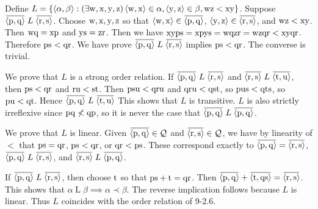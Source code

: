 \begin{solution}
Define $L=\setb{\aprn{\alpha,\beta}}{(\exists \mrm w,\mrm x,\mrm y,\mrm z)\thinspace
\aprn{\mrm w,\mrm x}\in\alpha, \aprn{\mrm y,\mrm z}\in\beta, \mrm{wz}<\mrm{xy}}$.
Suppose $\overbar{\aprn{\mrm p,\mrm q}}\mathrel L \overbar{\aprn{\mrm r,\mrm s}}$.
Choose $\mathrm{w},\mathrm{x},\mathrm{y},\mathrm{z}$ so that $\aprn{\mrm w,\mrm x}\in\overbar{\aprn{\mrm p,\mrm q}}$,
$\aprn{\mrm y,\mrm z}\in\overbar{\aprn{\mrm r,\mrm s}}$, and $\mathrm{wz}<\mathrm{xy}$.
Then $\mathrm{w}\mathrm{q}=\mathrm{x}\mathrm{p}$ and $\mathrm{y}\mathrm{s}=\mathrm{z}\mathrm{r}$.
Then we have $\mathrm{xyps}=\mathrm{xpys}=\mathrm{wqzr}=\mathrm{wzqr}<\mathrm{xyqr}$. Therefore $\mathrm{ps} < \mathrm{qr}$.
We have prove $\overbar{\aprn{\mrm p,\mrm q}}\mathrel L \overbar{\aprn{\mrm r,\mrm s}}$ implies $\mathrm{ps} < \mathrm{qr}$.
The converse is trivial.

We prove that $L$ is a strong order relation.
If $\overbar{\aprn{\mrm p,\mrm q}}\mathrel L \overbar{\aprn{\mrm r,\mrm s}}$ and
$\overbar{\aprn{\mrm r,\mrm s}} \mathrel L \overbar{\aprn{\mrm t,\mrm u}}$,
then $\mathrm{ps} < \mathrm{qr}$ and $\mathrm{ru} < \mathrm{st}$.
Then $\mathrm{psu} < \mathrm{qru}$ and $\mathrm{qru} < \mathrm{qst}$, so $\mathrm{pus} < \mathrm{qts}$, so $\mathrm{pu} < \mathrm{qt}$.
Hence $\overbar{\aprn{\mrm p,\mrm q}}\mathrel L \overbar{\aprn{\mrm t,\mrm u}}$
This shows that $L$ is transitive.
$L$ is also strictly irreflexive since $\mathrm{pq}\nless \mathrm{qp}$, so it is never the case that
$\overbar{\aprn{\mrm p,\mrm q}}\mathrel L \overbar{\aprn{\mrm p,\mrm q}}$.

We prove that $L$ is linear. Given $\overbar{\aprn{\mrm p,\mrm q}}\in \mc Q$ and
$\overbar{\aprn{\mrm r,\mrm s}}\in\mc Q$, we have by linearity of $<$ that $\mathrm{ps}=\mathrm{qr}$, $\mathrm{ps} < \mathrm{qr}$,
or $\mathrm{qr} < \mathrm{ps}$.
These correspond exactly to $\overbar{\aprn{\mrm p,\mrm q}}=\overbar{\aprn{\mrm r,\mrm s}}$,
$\overbar{\aprn{\mrm p,\mrm q}}\mathrel L\overbar{\aprn{\mrm r,\mrm s}}$, and
$\overbar{\aprn{\mrm r,\mrm s}}\mathrel L\overbar{\aprn{\mrm p,\mrm q}}$.

If $\overbar{\aprn{\mrm p,\mrm q}}\mathrel L\overbar{\aprn{\mrm r,\mrm s}}$, then choose $\mathrm{t}$
so that $\mathrm{ps} + \mathrm{t} = \mathrm{qr}$. Then $\overbar{\aprn{\mrm p,\mrm q}} + \overbar{\aprn{\mrm t,\mrm{qs}}}
=\overbar{\aprn{\mrm r,\mrm s}}$. This shows that $\alpha\mathrel L\beta \implies \alpha\prec\beta$.
The reverse implication follows because $L$ is linear.
Thus $L$ coincides with the order relation of 9-2.6.
\end{solution}

